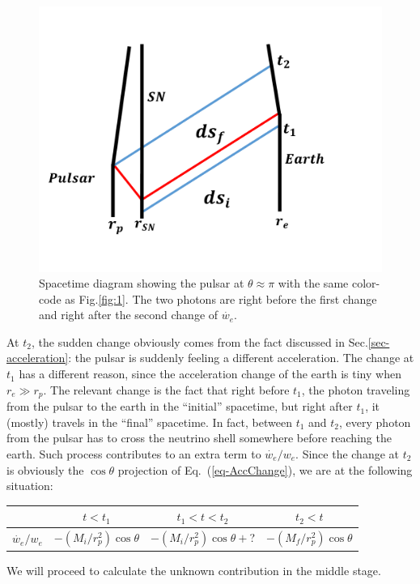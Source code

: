\documentclass[aps,showpacs,twocolumn,floats,prd,superscriptaddress,nofootinbib]{revtex4}
\begin{document}
\begin{figure}[tb]
\begin{center}
\includegraphics[scale = 0.3]{Image5.pdf}
\caption{Spacetime diagram showing the pulsar at $\theta \approx \pi$ with the same color-code as Fig.\ref{fig:1}. The two photons are right before the first change and right after the second change of $\dot{w_e}$.}
\label{fig-opposite}
\end{center}
\end{figure}

At $t_2$, the sudden change obviously comes from the fact discussed in Sec.\ref{sec-acceleration}: the pulsar is suddenly feeling a different acceleration. The change at $t_1$ has a different reason, since the acceleration change of the earth is tiny when $r_e\gg r_p$. The relevant change is the fact that right before $t_1$, the photon traveling from the pulsar to the earth in the ``initial'' spacetime, but right after $t_1$, it (mostly) travels in the ``final'' spacetime. In fact, between $t_1$ and $t_2$, every photon from the pulsar has to cross the neutrino shell somewhere before reaching the earth. Such process contributes to an extra term to $\dot{w_e}/w_e$. Since the change at $t_2$ is obviously the $\cos\theta$ projection of Eq.~(\ref{eq-AccChange}), we are at the following situation:
\begin{center}
\begin{tabular}{| c | c | c | c |} 
\hline
       & $t<t_1$ & $t_1<t<t_2$ & $t_2<t$ \\ 
       \hline 
$\dot{w_e}/w_e$ &  $-(M_i/r_p^2)\cos\theta$   & $-(M_i/r_p^2)\cos\theta+$?    
& $-(M_f/r_p^2)\cos\theta$   \\ 
\hline 
\end{tabular}
\end{center}
We will proceed to calculate the unknown contribution in the middle stage.
\end{document}
